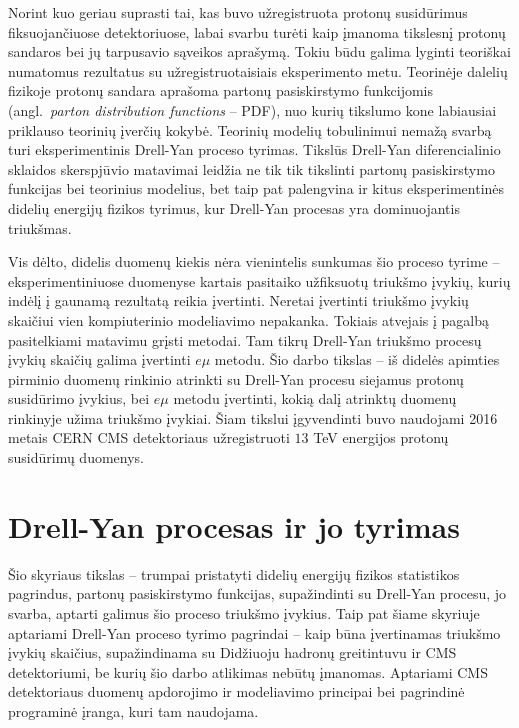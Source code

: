 \documentclass[a4paper, 12pt]{article}
\newcommand{\emu}{e\mu}
\begin{document}
Norint kuo geriau suprasti tai, kas buvo užregistruota protonų susidūrimus
fiksuojančiuose detektoriuose, labai svarbu turėti kaip įmanoma tikslesnį protonų
sandaros bei jų tarpusavio sąveikos aprašymą.
Tokiu būdu galima lyginti teoriškai numatomus rezultatus su užregistruotaisiais eksperimento
metu.
Teorinėje dalelių fizikoje protonų sandara aprašoma partonų pasiskirstymo funkcijomis
(angl.\ \textit{parton distribution functions} -- PDF), nuo kurių tikslumo kone labiausiai
priklauso teorinių įverčių kokybė.
Teorinių modelių tobulinimui nemažą svarbą turi eksperimentinis Drell-Yan proceso tyrimas.
Tikslūs Drell-Yan diferencialinio sklaidos skerspjūvio matavimai leidžia ne tik tik tikslinti
partonų pasiskirstymo funkcijas bei teorinius modelius, bet taip pat palengvina ir kitus
eksperimentinės didelių energijų fizikos tyrimus, kur Drell-Yan procesas yra dominuojantis triukšmas.

Vis dėlto, didelis duomenų kiekis nėra vienintelis sunkumas šio proceso tyrime -- eksperimentiniuose
duomenyse kartais pasitaiko užfiksuotų triukšmo įvykių, kurių indėlį į gaunamą rezultatą reikia
įvertinti.
Neretai įvertinti triukšmo įvykių skaičiui vien kompiuterinio modeliavimo nepakanka.
Tokiais atvejais į pagalbą pasitelkiami matavimu grįsti metodai.
Tam tikrų Drell-Yan triukšmo procesų įvykių skaičių galima įvertinti $\emu$ metodu.
Šio darbo tikslas -- iš didelės apimties pirminio duomenų rinkinio atrinkti su Drell-Yan
procesu siejamus protonų susidūrimo įvykius, bei $\emu$ metodu įvertinti, kokią dalį atrinktų
duomenų rinkinyje užima triukšmo įvykiai. Šiam tikslui įgyvendinti buvo naudojami 2016 metais
CERN CMS detektoriaus užregistruoti $13$ TeV energijos protonų susidūrimų duomenys.

\clearpage

\section{Drell-Yan procesas ir jo tyrimas}

Šio skyriaus tikslas -- trumpai pristatyti didelių energijų fizikos statistikos pagrindus, partonų pasiskirstymo funkcijas, supažindinti su Drell-Yan procesu, jo svarba, aptarti galimus šio proceso triukšmo įvykius. Taip pat šiame skyriuje aptariami Drell-Yan proceso tyrimo pagrindai -- kaip būna įvertinamas triukšmo įvykių skaičius, supažindinama su Didžiuoju hadronų greitintuvu ir CMS detektoriumi, be kurių šio darbo atlikimas nebūtų įmanomas. Aptariami CMS detektoriaus duomenų apdorojimo ir modeliavimo principai bei pagrindinė programinė įranga, kuri tam naudojama.
\end{document}
